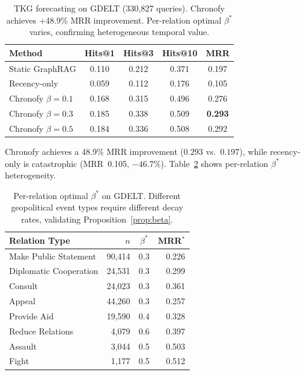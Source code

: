 \documentclass[conference]{IEEEtran}
\begin{document}
\begin{table}[t]
\centering
\caption{TKG forecasting on GDELT (330,827 queries). Chronofy achieves +48.9\% MRR improvement. Per-relation optimal $\beta^*$ varies, confirming heterogeneous temporal value.}
\label{tab:gdelt}
\begin{tabular}{@{}lcccc@{}}
\toprule
\textbf{Method} & \textbf{Hits@1} & \textbf{Hits@3} & \textbf{Hits@10} & \textbf{MRR} \\
\midrule
Static GraphRAG & 0.110 & 0.212 & 0.371 & 0.197 \\
Recency-only & 0.059 & 0.112 & 0.176 & 0.105 \\
Chronofy $\beta{=}0.1$ & 0.168 & 0.315 & 0.496 & 0.276 \\
Chronofy $\beta{=}0.3$ & 0.185 & 0.338 & 0.509 & \textbf{0.293} \\
Chronofy $\beta{=}0.5$ & 0.184 & 0.336 & 0.508 & 0.292 \\
\bottomrule
\end{tabular}
\end{table}

Chronofy achieves a 48.9\% MRR improvement ($0.293$ vs.~$0.197$), while recency-only is catastrophic (MRR~0.105, $-46.7\%$). Table~\ref{tab:gdelt_perrel} shows per-relation $\beta^*$ heterogeneity.

\begin{table}[t]
\centering
\caption{Per-relation optimal $\beta^*$ on GDELT. Different geopolitical event types require different decay rates, validating Proposition~\ref{prop:beta}.}
\label{tab:gdelt_perrel}
\begin{tabular}{@{}lrcr@{}}
\toprule
\textbf{Relation Type} & \textbf{$n$} & \textbf{$\beta^*$} & \textbf{MRR$^*$} \\
\midrule
Make Public Statement & 90,414 & 0.3 & 0.226 \\
Diplomatic Cooperation & 24,531 & 0.3 & 0.299 \\
Consult & 24,023 & 0.3 & 0.361 \\
Appeal & 44,260 & 0.3 & 0.257 \\
Provide Aid & 19,590 & 0.4 & 0.328 \\
Reduce Relations & 4,079 & 0.6 & 0.397 \\
Assault & 3,044 & 0.5 & 0.503 \\
Fight & 1,177 & 0.5 & 0.512 \\
\bottomrule
\end{tabular}
\end{table}
\end{document}

